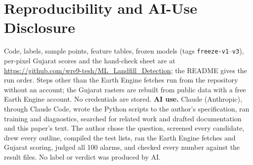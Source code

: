 \documentclass{article}
\begin{document}
\section{Reproducibility and AI-Use Disclosure}
Code, labels, sample points, feature tables, frozen models (tags \texttt{freeze-v1}--\texttt{v3}), per-pixel Gujarat scores and the hand-check sheet are at \url{https://github.com/wre9-tesh/ML_Landfill_Detection}; the README gives the run order. Steps other than the Earth Engine fetches run from the repository without an account; the Gujarat rasters are rebuilt from public data with a free Earth Engine account. No credentials are stored. \textbf{AI use.} Claude (Anthropic), through Claude Code, wrote the Python scripts to the author's specification, ran training and diagnostics, searched for related work and drafted documentation and this paper's text. The author chose the question, screened every candidate, drew every outline, compiled the test lists, ran the Earth Engine fetches and Gujarat scoring, judged all 100 alarms, and checked every number against the result files. No label or verdict was produced by AI.

{\small


}
\end{document}
